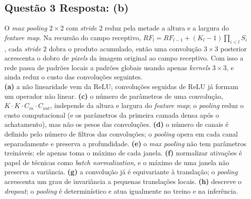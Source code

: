 \documentclass[11pt,a4paper]{article}
\begin{document}
\subsection*{Questão 3 \textemdash{} Resposta: (b)}
O \textit{max pooling} $2 \times 2$ com \textit{stride} $2$ reduz pela metade a altura e a largura do \textit{feature map}. Na recursão do campo receptivo, $RF_l = RF_{l-1} + (K_l - 1)\prod_{i<l} S_i$, cada \textit{stride} $2$ dobra o produto acumulado, então uma convolução $3 \times 3$ posterior acrescenta o dobro de \textit{pixels} da imagem original ao campo receptivo. Com isso a rede passa de padrões locais a padrões globais usando apenas \textit{kernels} $3 \times 3$, e ainda reduz o custo das convoluções seguintes.\\
\textbf{(a)} a não linearidade vem da ReLU; convoluções seguidas de ReLU já formam um operador não linear.
\textbf{(c)} o número de parâmetros de uma convolução, $K \cdot K \cdot C_{in} \cdot C_{out}$, independe da altura e largura do \textit{feature map}; o \textit{pooling} reduz o custo computacional (e os parâmetros da primeira camada densa após o achatamento), mas não os pesos das convoluções.
\textbf{(d)} o número de canais é definido pelo número de filtros das convoluções; o \textit{pooling} opera em cada canal separadamente e preserva a profundidade.
\textbf{(e)} o \textit{max pooling} não tem parâmetros treináveis; ele apenas toma o máximo de cada janela.
\textbf{(f)} normalizar ativações é papel de técnicas como \textit{batch normalization}, e o máximo de uma janela não preserva a variância.
\textbf{(g)} a convolução já é equivariante à translação; o \textit{pooling} acrescenta um grau de invariância a pequenas translações locais.
\textbf{(h)} descreve o \textit{dropout}; o \textit{pooling} é determinístico e atua igualmente no treino e na inferência.
\end{document}
